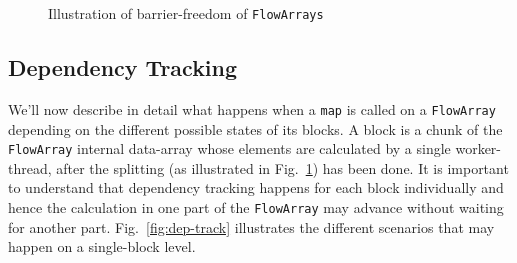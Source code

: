 \documentclass[runningheads,a4paper,fleqn]{llncs}
\begin{document}
\begin{figure}
  \caption{Illustration of barrier-freedom of \texttt{FlowArrays}}
  \label{fig:barrier-free}
\end{figure}

\subsection{Dependency Tracking}
We'll now describe in detail what happens when a \texttt{map} is
called on a \texttt{FlowArray} depending on the different possible states of
its blocks. A block is a chunk of the \texttt{FlowArray} internal
data-array whose elements are calculated by a single worker-thread, after
the splitting (as illustrated 
in Fig.~\ref{fig:barrier-free}) has been done. It is important to
understand that dependency tracking 
happens for each block individually and hence the calculation in one
part of the \texttt{FlowArray} may advance without waiting for another
part. Fig.~\ref{fig:dep-track} illustrates the different scenarios that
may happen on a single-block level.
\end{document}
